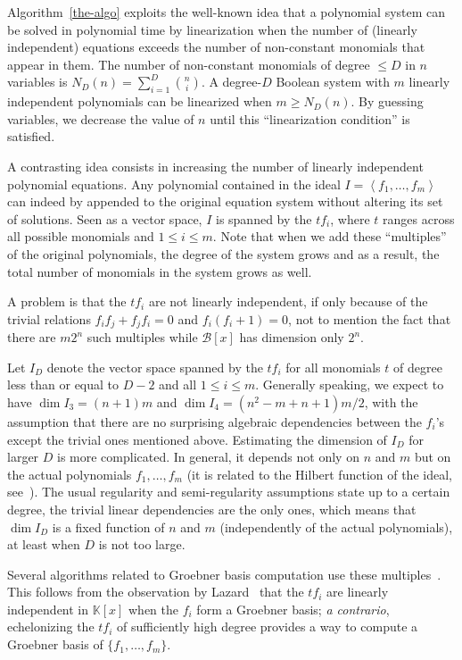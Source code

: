 \documentclass[a4paper,UKenglish,cleveref, autoref]{lipics-v2019}
\begin{document}
Algorithm~\ref{the-algo} exploits the well-known idea that a polynomial system
can be solved in polynomial time by linearization when the number of (linearly
independent) equations exceeds the number of non-constant monomials that appear
in them. The number of non-constant monomials of degree $\leq D$ in $n$
variables is $N_D(n) = \sum_{i=1}^D \binom{n}{i}$. A degree-$D$ Boolean system
with $m$ linearly independent polynomials can be linearized when
$m \geq N_D(n)$. By guessing variables, we decrease the value of $n$ until this
``linearization condition'' is satisfied.

A contrasting idea consists in increasing the number of linearly independent
polynomial equations.  Any polynomial contained in the ideal
$I = \left\langle f_1, \dots, f_m\right\rangle$ can indeed by appended to the
original equation system without altering its set of solutions. Seen as a
vector space, $I$ is spanned by the $t f_i$, where $t$ ranges across all
possible monomials and $1 \leq i \leq m$. Note that when we add these
``multiples'' of the original polynomials, the degree of the system grows and as
a result, the total number of monomials in the system grows as well.


A problem is that the $t f_i$ are not linearly independent, if only because of
the trivial relations $f_i f_j + f_j f_i = 0$ and $f_i (f_i + 1) = 0$, not to
mention the fact that there are $m 2^n$ such multiples while $\mathcal{B}[x]$
has dimension only $2^n$.

Let $I_D$ denote the vector space spanned by the $t f_i$ for all monomials $t$
of degree less than or equal to $D-2$ and all $1 \leq i \leq m$. Generally
speaking, we expect to have $\dim I_3 = (n+1) m$ and
$\dim I_4 = (n^2 - m + n + 1)m/2 $, with the assumption that there are no
surprising algebraic dependencies between the $f_i$'s except the trivial ones
mentioned above. Estimating the dimension of $I_D$ for larger $D$ is more
complicated. In general, it depends not only on $n$ and $m$ but on the actual
polynomials $f_1, \dots, f_m$ (it is related to the Hilbert function of the
ideal, see~\cite{Ideals_varieties_algos}). The usual regularity and
semi-regularity assumptions state up to a certain degree, the trivial linear
dependencies are the only ones, which means that $\dim I_D$ is a fixed function
of $n$ and $m$ (independently of the actual polynomials), at least when $D$ is
not too large.

Several algorithms related to Groebner basis computation use these
multiples~\cite{F4,F5,CourtoisKPS00,BardetFSS13,JouxV17}. This follows from the
observation by Lazard~\cite{Lazard83} that the $t f_i$ are linearly independent
in $\mathbb{K}[x]$ when the $f_i$ form a Groebner basis; \textit{a contrario},
echelonizing the $t f_i$ of sufficiently high degree provides a way to compute a
Groebner basis of $\{f_1, \dots, f_m\}$.
\end{document}
